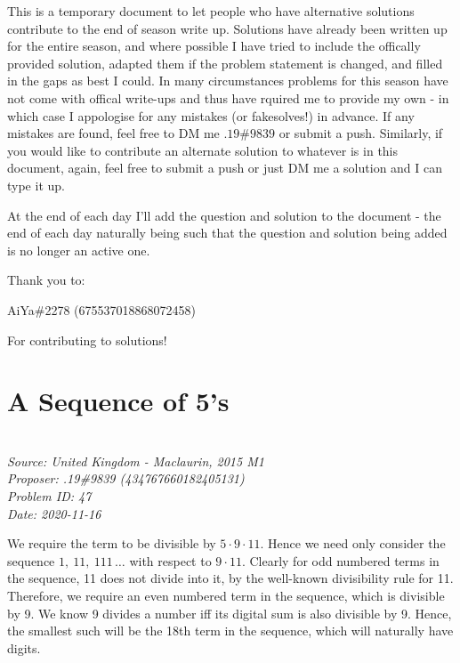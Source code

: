 \documentclass[titlepage=true]{scrartcl}
\def\Paiya{AiYa\#2278 (675537018868072458)}
\begin{document}
\SSfp

This is a temporary document to let people who have alternative solutions contribute to the end of season write up. Solutions have already been written up for the entire season, and where possible I have tried to include the offically provided solution, adapted them if the problem statement is changed, and filled in the gaps as best I could. In many circumstances problems for this season have not come with offical write-ups and thus have rquired me to provide my own - in which case I appologise for any mistakes (or fakesolves!) in advance. If any mistakes are found, feel free to DM me \(.19\#9839\) or submit a push. Similarly, if you would like to contribute an alternate solution to whatever is in this document, again, feel free to submit a push or just DM me a solution and I can type it up.\medskip

At the end of each day I'll add the question and solution to the document - the end of each day naturally being such that the question and solution being added is no longer an active one.\bigskip

Thank you to:\medskip

\Paiya\medskip

For contributing to solutions! 

\newpage
    
\section{A Sequence of 5's}

    \SSbreak\\
    \emph{Source: United Kingdom - Maclaurin, 2015 M1}\\
    \emph{Proposer: .19\#9839 (434767660182405131)}\\
    \emph{Problem ID: 47}\\
    \emph{Date: 2020-11-16}\\
    \SSbreak
        
    \bigskip

    \begin{solution}\hfil\medskip

        We require the term to be divisible by \(5\cdot9\cdot 11\). Hence we need only consider the sequence \(1,\ 11,\ 111\,\ldots\) with respect to \(9\cdot11\). Clearly for odd numbered terms in the sequence, 11 does not divide into it, by the well-known divisibility rule for 11. Therefore, we require an even numbered term in the sequence, which is divisible by 9. We know 9 divides a number iff its digital sum is also divisible by 9. Hence, the smallest such will be the 18th term in the sequence, which will naturally have  digits. 
    \end{solution}\bigskip
\end{document}

